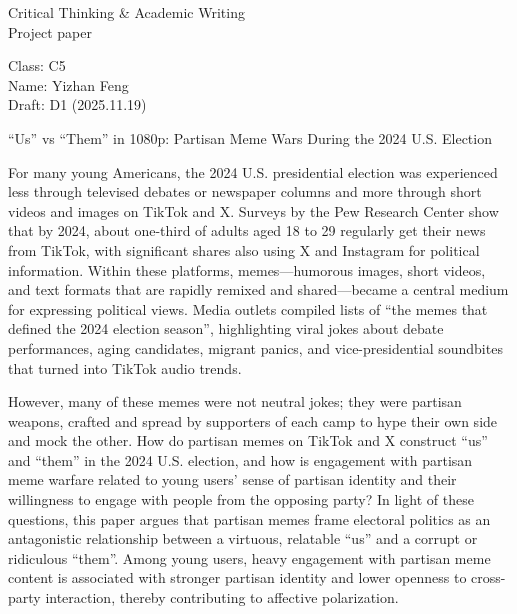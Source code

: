\documentclass[12pt,twoside]{article}
\begin{document}
{\fontsize{16}{35}\selectfont
Critical Thinking \& Academic Writing\\
Project paper\par
}

\vspace{-0.5\baselineskip}

Class: C5 \\
Name: Yizhan Feng \\
Draft: D1 (2025.11.19) \\

\vspace{-0.75\baselineskip}

\begin{center}
{\fontsize{14}{17}\selectfont
``Us'' vs ``Them'' in 1080p: Partisan Meme Wars During the 2024 U.S. Election\par
}
\end{center}

\vspace{-\baselineskip}


For many young Americans, the 2024 U.S. presidential election was experienced less through televised debates or newspaper columns and more through short videos and images on TikTok and X. Surveys by the Pew Research Center show that by 2024, about one-third of adults aged 18 to 29 regularly get their news from TikTok, with significant shares also using X and Instagram for political information. \parencite{shearer2024newsTikTokXFacebookInstagram} Within these platforms, memes---humorous images, short videos, and text formats that are rapidly remixed and shared---became a central medium for expressing political views. Media outlets compiled lists of ``the memes that defined the 2024 election season'', highlighting viral jokes about debate performances, aging candidates, migrant panics, and vice-presidential soundbites that turned into TikTok audio trends. 

However, many of these memes were not neutral jokes; they were partisan weapons, crafted and spread by supporters of each camp to hype their own side and mock the other. How do partisan memes on TikTok and X construct ``us'' and ``them'' in the 2024 U.S. election, and how is engagement with partisan meme warfare related to young users' sense of partisan identity and their willingness to engage with people from the opposing party? In light of these questions, this paper argues that partisan memes frame electoral politics as an antagonistic relationship between a virtuous, relatable ``us'' and a corrupt or ridiculous “them”. Among young users, heavy engagement with partisan meme content is associated with stronger partisan identity and lower openness to cross-party interaction, thereby contributing to affective polarization.
\end{document}
